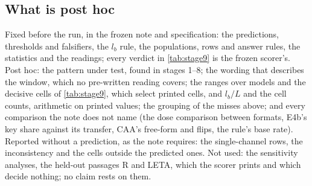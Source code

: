 \subsection{What is post hoc}\label{app:s9-posthoc}

Fixed before the run, in the frozen note and specification: the predictions, thresholds and falsifiers, the $l_b$ rule, the populations, rows and answer rules, the statistics and the readings; every verdict in \cref{tab:stage9} is the frozen scorer's. Post hoc: the pattern under test, found in stages 1--8; the wording that describes the window, which no pre-written reading covers; the ranges over models and the decisive cells of \cref{tab:stage9}, which select printed cells, and $l_b/L$ and the cell counts, arithmetic on printed values; the grouping of the misses above; and every comparison the note does not name (the dose comparison between formats, E4b's key share against its transfer, CAA's free-form and \fmtLetter{} flips, the rule's base rate). Reported without a prediction, as the note requires: the single-channel rows, the inconsistency and the cells outside the predicted ones. Not used: the sensitivity analyses, the held-out passages R and LETA, which the scorer prints and which decide nothing; no claim rests on them.
